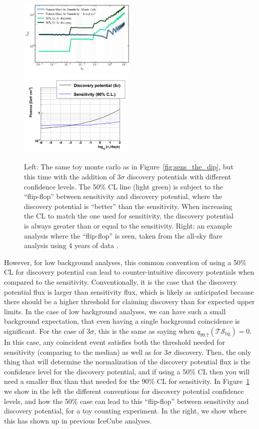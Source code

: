 \documentclass[a4paper,11pt]{article}
\newcommand\tsbg{\mathcal{TS_{\mathrm{bg}}}}
\begin{document}
\begin{figure}
    \centering
    \includegraphics[width=0.5\textwidth]{figures/discovery_potential_flip_flop.png}
    \includegraphics[width=0.49\textwidth]{figures/flare_flip_flop_example.png}
    \caption{Left: The same toy monte carlo as in Figure~\ref{fig:sens_the_dip}, but this time with the addition of $3\sigma$ discovery potentials with different confidence levels. The 50\% CL line (light green) is subject to the ``flip-flop'' between sensitivity and discovery potential, where the discovery potential is ``better'' than the sensitivity. When increasing the CL to match the one used for sensitivity, the discovery potential is always greater than or equal to the sensitivity. Right: an example analysis where the ``flip-flop'' is seen, taken from the all-sky flare analysis using 4 years of data \cite{IceCube:2015usw}.}
    \label{fig:flip_flop}
\end{figure}

However, for low background analyses, this common convention of using a 50\% CL for discovery potential can lead to counter-intuitive discovery potentials when compared to the sensitivity. Conventionally, it is the case that the discovery potential flux is larger than sensitivity flux, which is likely as anticipated because there should be a higher threshold for claiming discovery than for expected upper limits. In the case of low background analyses, we can have such a small background expectation, that even having a single background coincidence is significant. For the case of $3\sigma$, this is the same as saying when $q_{99.7}(\tsbg) = 0$. In this case, any coincident event satisfies both the threshold needed for sensitivity (comparing to the median) as well as for $3\sigma$ discovery. Then, the only thing that will determine the normalization of the discovery potential flux is the confidence level for the discovery potential, and if using a 50\% CL then you will need a smaller flux than that needed for the 90\% CL for sensitivity. In Figure~\ref{fig:flip_flop} we show in the left the different conventions for discovery potential confidence levels, and how the 50\% case can lead to this ``flip-flop'' between sensitivity and discovery potential, for a toy counting experiment. In the right, we show where this has shown up in previous IceCube analyses.
\end{document}
